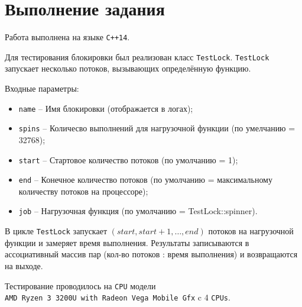 \section{Выполнение задания}

Работа выполнена на языке \verb|C++14|.

Для тестирования блокировки был реализован класс \verb|TestLock|.
\verb|TestLock| запускает несколько потоков, вызывающих определённую функцию.

Входные параметры:

\begin{itemize}
    \item \verb|name| -- Имя блокировки (отображается в логах);
    \item \verb|spins| -- Количесво выполнений для нагрузочной функции (по умелчанию = 32768);
    \item \verb|start| -- Стартовое количество потоков (по умолчанию = 1);
    \item \verb|end| -- Конечное количество потоков (по умолчанию = максимальному количеству потоков на процессоре);
    \item \verb|job| -- Нагрузочная функция (по умолчанию = TestLock::spinner).
\end{itemize}

В цикле \verb|TestLock| запускает $ (start, start + 1, \dots, end) $ потоков
на нагрузочной функции и замеряет время выполнения. 
Результаты записываются в ассоциативный массив пар 
(кол-во потоков : время выполнения)
и возвращаются на выходе.

Тестирование проводилось на \verb|CPU| модели\\
\verb|AMD Ryzen 3 3200U with Radeon Vega Mobile Gfx|
c 4 \verb|CPUs|.

